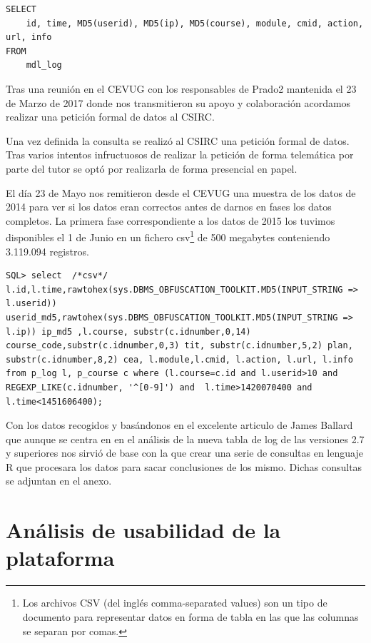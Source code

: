 \begin{lstlisting}
SELECT
    id, time, MD5(userid), MD5(ip), MD5(course), module, cmid, action, url, info
FROM
    mdl_log
\end{lstlisting}


Tras una reunión en el CEVUG con los responsables de Prado2 mantenida el 23 de Marzo de 2017 donde nos transmitieron su apoyo y colaboración acordamos realizar una petición formal de datos al CSIRC.

Una vez definida la consulta se realizó al CSIRC una petición formal de datos. Tras varios intentos infructuosos de realizar la petición de forma telemática por parte del tutor se optó por realizarla de forma presencial en papel.

El día 23 de Mayo nos remitieron desde el CEVUG una muestra de los datos de 2014 para ver si los datos eran correctos antes de darnos en fases los datos completos. La primera fase correspondiente a los datos de 2015 los tuvimos disponibles el 1 de Junio en un fichero csv\footnote{Los archivos CSV (del inglés comma-separated values) son un tipo de documento para representar datos en forma de tabla en las que las columnas se separan por comas.} de 500 megabytes conteniendo 3.119.094 registros.


\begin{lstlisting}
SQL> select  /*csv*/ l.id,l.time,rawtohex(sys.DBMS_OBFUSCATION_TOOLKIT.MD5(INPUT_STRING => l.userid)) userid_md5,rawtohex(sys.DBMS_OBFUSCATION_TOOLKIT.MD5(INPUT_STRING => l.ip)) ip_md5 ,l.course, substr(c.idnumber,0,14) course_code,substr(c.idnumber,0,3) tit, substr(c.idnumber,5,2) plan, substr(c.idnumber,8,2) cea, l.module,l.cmid, l.action, l.url, l.info from p_log l, p_course c where (l.course=c.id and l.userid>10 and REGEXP_LIKE(c.idnumber, '^[0-9]') and  l.time>1420070400 and l.time<1451606400);

\end{lstlisting}

Con los datos recogidos y basándonos en el excelente articulo\cite{art_02} de James Ballard que aunque se centra en en el análisis de la nueva tabla de log de las versiones 2.7 y superiores nos sirvió de base con la que crear una serie de consultas en lenguaje R que procesara los datos para sacar conclusiones de los mismo. Dichas consultas se adjuntan en el anexo.

\section{Análisis de usabilidad de la plataforma}


